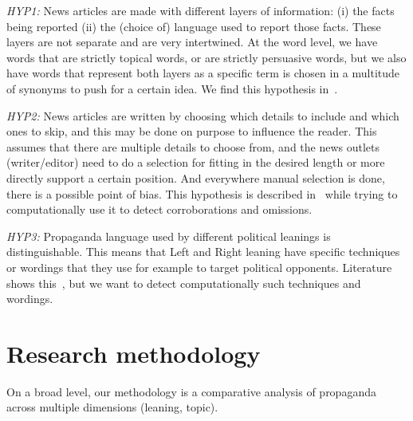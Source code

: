 \emph{HYP1:} News articles are made with different layers of information: (i) the facts being reported (ii) the (choice of) language used to report those facts. %
These layers are not separate and are very intertwined. At the word level, we have words that are strictly topical words, or are strictly persuasive words, but we also have words that represent both layers as a specific term is chosen in a multitude of synonyms to push for a certain idea.
We find this hypothesis in~\citep{jenkins2013thin,vanderwicken1995news,jang2023proximate}.

\emph{HYP2:} News articles are written by choosing which details to include and which ones to skip, and this may be done on purpose to influence the reader. This assumes that there are multiple details to choose from, and the news outlets (writer/editor) need to do a selection for fitting in the desired length or more directly support a certain position. And everywhere manual selection is done, there is a possible point of bias. This hypothesis is described in~\cite{bountouridis2018explaining} while trying to computationally use it to detect corroborations and omissions.

\emph{HYP3:} Propaganda language used by different political leanings is distinguishable. This means that Left and Right leaning have specific techniques or wordings that they use for example to target political opponents. Literature shows this~\citep{blumberg1986comparative}, but we want to detect computationally such techniques and wordings.




\section{\statusgreen Research methodology}
\label{sec:intro_method}

On a broad level, our methodology is a comparative analysis of propaganda across multiple dimensions (leaning, topic).

